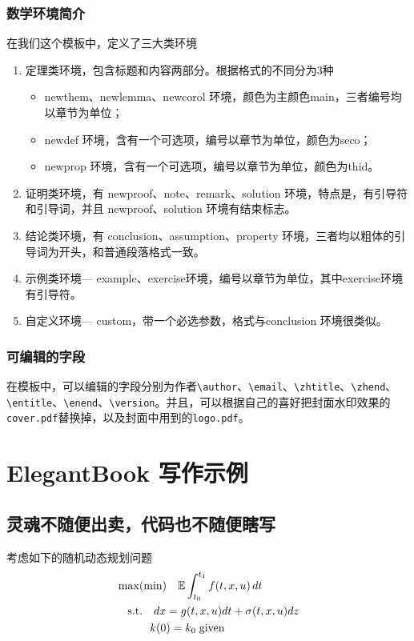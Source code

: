 \documentclass[color=green,mathpazo,titlestyle=hang,11pt]{elegantbook}
\begin{document}
\subsection{数学环境简介}
在我们这个模板中，定义了三大类环境
\begin{enumerate}
\item 定理类环境，包含标题和内容两部分。根据格式的不同分为3种
\begin{itemize}
\item {\color{main} newthem、newlemma、newcorol} 环境，颜色为主颜色main，三者编号均以章节为单位；
\item {\color{main} newdef} 环境，含有一个可选项，编号以章节为单位，颜色为seco；
\item {\color{main} newprop} 环境，含有一个可选项，编号以章节为单位，颜色为thid。
\end{itemize}
\item 证明类环境，有  {\color{main} newproof、note、remark、solution} 环境，特点是，有引导符和引导词，并且 newproof、solution 环境有结束标志。
\item 结论类环境，有 {\color{main}  conclusion、assumption、property} 环境，三者均以粗体的引导词为开头，和普通段落格式一致。
\item 示例类环境--- {\color{main} example、exercise}环境，编号以章节为单位，其中exercise环境有引导符。
\item 自定义环境--- {\color{main} custom}，带一个必选参数，格式与conclusion 环境很类似。
\end{enumerate}

\subsection{可编辑的字段}
在模板中，可以编辑的字段分别为作者\verb|\author|、\verb|\email|、\verb|\zhtitle|、\verb|\zhend|、\verb|\entitle|、\verb|\enend|、\verb|\version|。并且，可以根据自己的喜好把封面水印效果的\verb|cover.pdf|替换掉，以及封面中用到的\verb|logo.pdf|。

\chapter{ElegantBook 写作示例}

\section{灵魂不随便出卖，代码也不随便瞎写}
\lipsum[3]
考虑如下的随机动态规划问题
\begin{align*}
&\max(\min)\quad \mathbb{E}\int_{t_0}^{t_1}f(t,x,u)\,dt\\
&\quad\mbox{s.t.} \quad dx=g(t,x,u)dt+\sigma(t,x,u)dz\\
&\quad \hspace{2.em} k(0)=k_0\;\text{given}
\end{align*}
\end{document}

